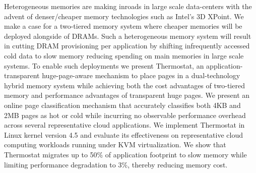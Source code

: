 Heterogeneous memories are making inroads in large scale data-centers with the
advent of denser/cheaper memory technologies such as Intel's 3D XPoint. We make
a case for a two-tiered memory system where cheaper memories will be deployed
alongside of DRAMs. Such a heterogeneous memory system will result in cutting
DRAM provisioning per application by shifting infrequently accessed cold data to
slow memory reducing spending on main memories in large scale systems.
To enable such deployments we present Thermostat, an application-transparent
huge-page-aware mechanism to place pages in a dual-technology hybrid memory
system while achieving both the cost advantages of two-tiered memory and
performance advantages of transparent huge pages.  We present an online page
classification mechanism that accurately classifies both 4KB and 2MB pages as
hot or cold while incurring no observable performance overhead across several
representative cloud applications.  We implement Thermostat in Linux kernel
version 4.5 and evaluate its effectiveness on representative cloud computing
workloads running under KVM virtualization.  We show that Thermostat migrates up
to 50\% of application footprint to slow memory while limiting performance
degradation to 3\%, thereby reducing memory cost.
